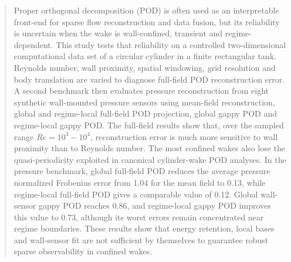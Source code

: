 \documentclass[preprint,12pt]{elsarticle}
\begin{document}
\begin{frontmatter}
\begin{abstract}
Proper orthogonal decomposition (POD) is often used as an interpretable front-end for sparse flow reconstruction and data fusion, but its reliability is uncertain when the wake is wall-confined, transient and regime-dependent. This study tests that reliability on a controlled two-dimensional computational data set of a circular cylinder in a finite rectangular tank. Reynolds number, wall proximity, spatial windowing, grid resolution and body translation are varied to diagnose full-field POD reconstruction error. A second benchmark then evaluates pressure reconstruction from eight synthetic wall-mounted pressure sensors using mean-field reconstruction, global and regime-local full-field POD projection, global gappy POD and regime-local gappy POD. The full-field results show that, over the sampled range $Re=10^3-10^4$, reconstruction error is much more sensitive to wall proximity than to Reynolds number. The most confined wakes also lose the quasi-periodicity exploited in canonical cylinder-wake POD analyses. In the pressure benchmark, global full-field POD reduces the average pressure normalized Frobenius error from 1.04 for the mean field to 0.13, while regime-local full-field POD gives a comparable value of 0.12. Global wall-sensor gappy POD reaches 0.86, and regime-local gappy POD improves this value to 0.73, although its worst errors remain concentrated near regime boundaries. These results show that energy retention, local bases and wall-sensor fit are not sufficient by themselves to guarantee robust sparse observability in confined wakes.
\end{abstract}




\end{frontmatter}
\end{document}
